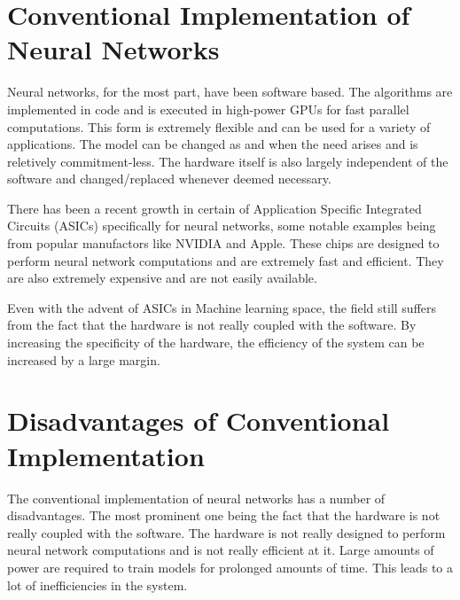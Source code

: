 \section{Conventional Implementation of Neural Networks}

Neural networks, for the most part, have been software based. The algorithms are implemented in code and is executed in high-power GPUs for fast parallel computations. This form is extremely flexible and can be used for a variety of applications. The model can be changed as and when the need arises and is reletively commitment-less. The hardware itself is also largely independent of the software and changed/replaced whenever deemed necessary.

There has been a recent growth in certain of Application Specific Integrated Circuits (ASICs) specifically for neural networks, some notable examples being from popular manufactors like NVIDIA \cite{NVIDIAT4Tensor} and Apple. These chips are designed to perform neural network computations and are extremely fast and efficient. They are also extremely expensive and are not easily available.

Even with the advent of ASICs in Machine learning space, the field still suffers from the fact that the hardware is not really coupled with the software. By increasing the specificity of the hardware, the efficiency of the system can be increased by a large margin.

\section{Disadvantages of Conventional Implementation}

The conventional implementation of neural networks has a number of disadvantages. The most prominent one being the fact that the hardware is not really coupled with the software. The hardware is not really designed to perform neural network computations and is not really efficient at it. Large amounts of power are required to train models for prolonged amounts of time. This leads to a lot of inefficiencies in the system.